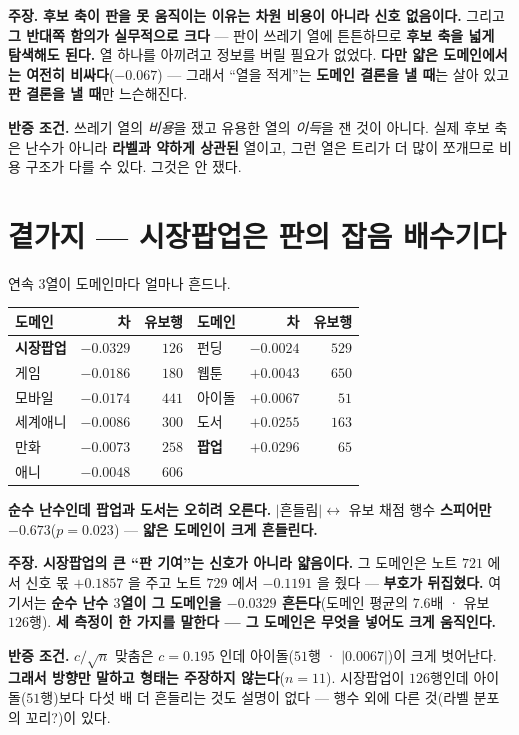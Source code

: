 \documentclass[10pt,a4paper]{article}
\newcommand{\claim}[2]{\begin{claimbox}\textbf{주장.} #1\par\smallskip
  \textcolor{gray!70}{\textbf{반증 조건.} #2}\end{claimbox}}
\begin{document}
\claim{\textbf{후보 축이 판을 못 움직이는 이유는 차원 비용이 아니라 신호
없음이다.} 그리고 \textbf{그 반대쪽 함의가 실무적으로 크다} --- 판이 쓰레기 열에
튼튼하므로 \textbf{후보 축을 넓게 탐색해도 된다.} 열 하나를 아끼려고 정보를 버릴
필요가 없었다. \textbf{다만 얇은 도메인에서는 여전히 비싸다}($-0.067$) --- 그래서
``열을 적게''는 \textbf{도메인 결론을 낼 때}는 살아 있고 \textbf{판 결론을 낼 때}만
느슨해진다.}
{쓰레기 열의 \emph{비용}을 쟀고 유용한 열의 \emph{이득}을 잰 것이 아니다. 실제
후보 축은 난수가 아니라 \textbf{라벨과 약하게 상관된} 열이고, 그런 열은 트리가 더
많이 쪼개므로 비용 구조가 다를 수 있다. 그것은 안 쟀다.}

\section{곁가지 --- 시장팝업은 판의 잡음 배수기다}

연속 $3$열이 도메인마다 얼마나 흔드나.

\begin{center}
\begin{tabular}{lrr|lrr}
\toprule
도메인 & 차 & 유보행 & 도메인 & 차 & 유보행 \\
\midrule
\textbf{시장팝업} & $\mathbf{-0.0329}$ & $126$ & 펀딩 & $-0.0024$ & $529$ \\
게임 & $-0.0186$ & $180$ & 웹툰 & $+0.0043$ & $650$ \\
모바일 & $-0.0174$ & $441$ & 아이돌 & $+0.0067$ & $51$ \\
세계애니 & $-0.0086$ & $300$ & 도서 & $+0.0255$ & $163$ \\
만화 & $-0.0073$ & $258$ & \textbf{팝업} & $\mathbf{+0.0296}$ & $65$ \\
애니 & $-0.0048$ & $606$ & & & \\
\bottomrule
\end{tabular}
\end{center}

\textbf{순수 난수인데 팝업과 도서는 오히려 오른다.} $|$흔들림$| \leftrightarrow$
유보 채점 행수 \textbf{스피어만 $-0.673$}($p{=}0.023$) --- \textbf{얇은 도메인이
크게 흔들린다.}

\claim{\textbf{시장팝업의 큰 ``판 기여''는 신호가 아니라 얇음이다.} 그 도메인은
노트 $721$ 에서 신호 몫 $+0.1857$ 을 주고 노트 $729$ 에서 $-0.1191$ 을 줬다 ---
\textbf{부호가 뒤집혔다.} 여기서는 \textbf{순수 난수 $3$열이 그 도메인을 $-0.0329$
흔든다}(도메인 평균의 $7.6$배 · 유보 $126$행). \textbf{세 측정이 한 가지를 말한다
--- 그 도메인은 무엇을 넣어도 크게 움직인다.}}
{$c/\sqrt{n}$ 맞춤은 $c{=}0.195$ 인데 아이돌($51$행 · $|0.0067|$)이 크게 벗어난다.
\textbf{그래서 방향만 말하고 형태는 주장하지 않는다}($n{=}11$). 시장팝업이
$126$행인데 아이돌($51$행)보다 다섯 배 더 흔들리는 것도 설명이 없다 --- 행수 외에
다른 것(라벨 분포의 꼬리?)이 있다.}
\end{document}

